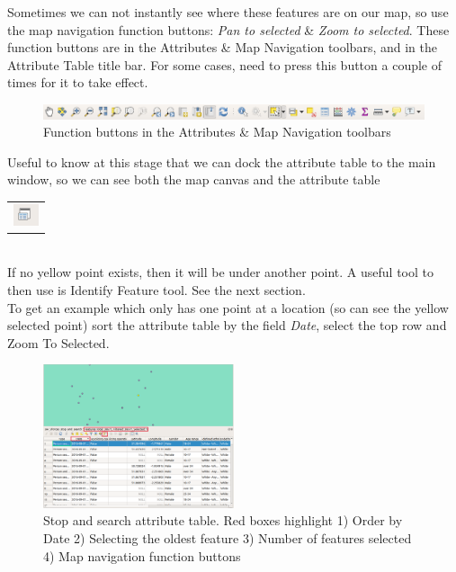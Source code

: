 Sometimes we can not instantly see where these features are on our map, so use the map navigation function buttons: \textit{Pan to selected} \& \textit{Zoom to selected}. These function buttons are in the Attributes \& Map Navigation toolbars, and in the Attribute Table title bar. For some cases, need to press this button a couple of times for it to take effect.

\begin{figure}[!h]
	\centering
	\includegraphics[width=1\textwidth]{images/attribute_and_map_navigation_toolbars_icons.png}
	\caption{Function buttons in the Attributes \& Map Navigation toolbars}
	\label{ft_fig_firstfig3}
\end{figure}

Useful to know at this stage that we can dock the attribute table to the main window, so we can see both the map canvas and the attribute table 
\begin{tabular}{@{}c@{}}\includegraphics[width=4ex]{images/dock_attribute_table_icon.png}\end{tabular}\\

If no yellow point exists, then it will be under another point.
A useful tool to then use is Identify Feature tool. See the next section.\\
\null\newpage
To get an example which only has one point at a location (so can see the yellow selected point) sort the attribute table by the field \textit{Date}, select the top row and Zoom To Selected.
\begin{figure}[!h]
	\centering
	\includegraphics[width=0.5\textwidth]{images/stop_search_one_row_selected_oldest_date_redbox_docked_at_table.png}%
	\caption{Stop and search attribute table. Red boxes highlight 1) Order by Date 2) Selecting the oldest feature 3) Number of features selected 4) Map navigation function buttons}
	\label{ft_fig_firstfig3}
\end{figure}


